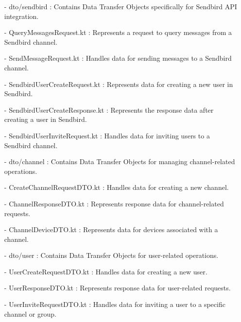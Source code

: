 \documentclass[conference]{IEEEtran}
\begin{document}
\begin{enumerate}
\begin{itemize}
\begin{itemize}
\begin{enumerate}
\begin{enumerate}
        \item[-] dto/sendbird : Contains Data Transfer Objects specifically for Sendbird API integration.\\
        \item[-] QueryMessagesRequest.kt : Represents a request to query messages from a Sendbird channel.\\
        \item[-] SendMessageRequest.kt : Handles data for sending messages to a Sendbird channel. \\
        \item[-] SendbirdUserCreateRequest.kt : Represents data for creating a new user in Sendbird.\\
        \item[-] SendbirdUserCreateResponse.kt : Represents the response data after creating a user in Sendbird.\\
        \item[-] SendbirdUserInviteRequest.kt : Handles data for inviting users to a Sendbird channel.\\
        
        \item[-] dto/channel : Contains Data Transfer Objects for managing channel-related operations.\\
        \item[-] CreateChannelRequestDTO.kt : Handles data for creating a new channel. \\
        \item[-] ChannelResponseDTO.kt : Represents response data for channel-related requests.\\
        \item[-] ChannelDeviceDTO.kt : Represents data for devices associated with a channel.\\
        
        \item[-] dto/user : Contains Data Transfer Objects for user-related operations. \\
        \item[-] UserCreateRequestDTO.kt : Handles data for creating a new user.\\
        \item[-] UserResponseDTO.kt : Represents response data for user-related requests.\\
        \item[-] UserInviteRequestDTO.kt : Handles data for inviting a user to a specific channel or group.\\
        

\end{enumerate}
\end{enumerate}
\end{itemize}
\end{itemize}
\end{enumerate}
\end{document}

